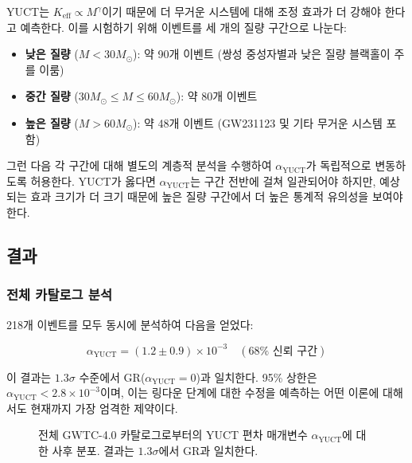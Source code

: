 \documentclass[11pt,a4paper]{article}
\theoremstyle{remark}
\newcommand{\Keff}{K_{\mathrm{eff}}}
\begin{document}
	YUCT는 $\Keff \propto M^{\gamma}$이기 때문에 더 무거운 시스템에 대해 조정 효과가 더 강해야 한다고 예측한다. 이를 시험하기 위해 이벤트를 세 개의 질량 구간으로 나눈다:
	
	\begin{itemize}
		\item \textbf{낮은 질량} ($M < 30 M_\odot$): 약 90개 이벤트 (쌍성 중성자별과 낮은 질량 블랙홀이 주를 이룸)
		\item \textbf{중간 질량} ($30 M_\odot \le M \le 60 M_\odot$): 약 80개 이벤트
		\item \textbf{높은 질량} ($M > 60 M_\odot$): 약 48개 이벤트 (GW231123 및 기타 무거운 시스템 포함)
	\end{itemize}
	
	그런 다음 각 구간에 대해 별도의 계층적 분석을 수행하여 $\alpha_{\text{YUCT}}$가 독립적으로 변동하도록 허용한다. YUCT가 옳다면 $\alpha_{\text{YUCT}}$는 구간 전반에 걸쳐 일관되어야 하지만, 예상되는 효과 크기가 더 크기 때문에 높은 질량 구간에서 더 높은 통계적 유의성을 보여야 한다.
	
	\subsection{결과}
	
	\subsubsection{전체 카탈로그 분석}
	
	218개 이벤트를 모두 동시에 분석하여 다음을 얻었다:
	
	\begin{equation}
		\alpha_{\text{YUCT}} = (1.2 \pm 0.9) \times 10^{-3} \quad (68\% \text{ 신뢰 구간})
		\label{eq:alpha-result}
	\end{equation}
	
	이 결과는 $1.3\sigma$ 수준에서 GR($\alpha_{\text{YUCT}} = 0$)과 일치한다. 95\% 상한은 $\alpha_{\text{YUCT}} < 2.8 \times 10^{-3}$이며, 이는 링다운 단계에 대한 수정을 예측하는 어떤 이론에 대해서도 현재까지 가장 엄격한 제약이다.
	
	\begin{figure}[htbp]
		\centering
		\caption{전체 GWTC-4.0 카탈로그로부터의 YUCT 편차 매개변수 $\alpha_{\text{YUCT}}$에 대한 사후 분포. 결과는 $1.3\sigma$에서 GR과 일치한다.}
		\label{fig:alpha-posterior}
	\end{figure}
	
\end{document}
